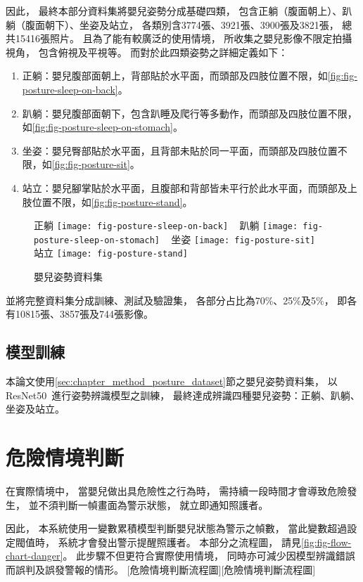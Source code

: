 \documentclass[class=NCU_thesis, crop=false]{standalone}
\begin{document}
因此，
最終本部分資料集將嬰兒姿勢分成基礎四類，
包含正躺（腹面朝上）、趴躺（腹面朝下）、坐姿及站立，
各類別含3774張、3921張、3900張及3821張，
總共15416張照片。
且為了能有較廣泛的使用情境，
所收集之嬰兒影像不限定拍攝視角，
包含俯視及平視等。
而對於此四類姿勢之詳細定義如下：
\begin{enumerate}
    \item 正躺：嬰兒腹部面朝上，背部貼於水平面，而頭部及四肢位置不限，如\cref{fig:fig-posture-sleep-on-back}。
    \item 趴躺：嬰兒腹部面朝下，包含趴睡及爬行等多動作，而頭部及四肢位置不限，如\cref{fig:fig-posture-sleep-on-stomach}。
    \item 坐姿：嬰兒臀部貼於水平面，且背部未貼於同一平面，而頭部及四肢位置不限，如\cref{fig:fig-posture-sit}。
    \item 站立：嬰兒腳掌貼於水平面，且腹部和背部皆未平行於此水平面，而頭部及上肢位置不限，如\cref{fig:fig-posture-stand}。
\end{enumerate}
\begin{figure}[!hbt]
    \centering
    \subcaptionbox
        {正躺
        \label{fig:fig-posture-sleep-on-back}}
        {\texttt{[image: fig-posture-sleep-on-back]}}
    ~
    \subcaptionbox
        {趴躺
        \label{fig:fig-posture-sleep-on-stomach}}
        {\texttt{[image: fig-posture-sleep-on-stomach]}}
    ~
    \subcaptionbox
        {坐姿
        \label{fig:fig-posture-sit}}
        {\texttt{[image: fig-posture-sit]}}
    ~
    \subcaptionbox
        {站立
        \label{fig:fig-posture-stand}}
        {\texttt{[image: fig-posture-stand]}}
    \caption{嬰兒姿勢資料集}
    \label{fig:fig-face-dataset}
\end{figure}

並將完整資料集分成訓練、測試及驗證集，
各部分占比為70\%、25\%及5\%，
即各有10815張、3857張及744張影像。

\subsection{模型訓練}
本論文使用\ref{sec:chapter_method_posture_dataset}節之嬰兒姿勢資料集，
以ResNet50~\cite{he_deep_2016}進行姿勢辨識模型之訓練，
最終達成辨識四種嬰兒姿勢：正躺、趴躺、坐姿及站立。

\section{危險情境判斷}
\label{sec:chapter_method_danger}
在實際情境中，
當嬰兒做出具危險性之行為時，
需持續一段時間才會導致危險發生，
並不須判斷一幀畫面為警示狀態，
就立即通知照護者。

因此，
本系統使用一變數累積模型判斷嬰兒狀態為警示之幀數，
當此變數超過設定閥值時，
系統才會發出警示提醒照護者。
本部分之流程圖，
請見\cref{fig:fig-flow-chart-danger}。
此步驟不但更符合實際使用情境，
同時亦可減少因模型辨識錯誤而誤判及誤發警報的情形。
[危險情境判斷流程圖][危險情境判斷流程圖]
\end{document}
